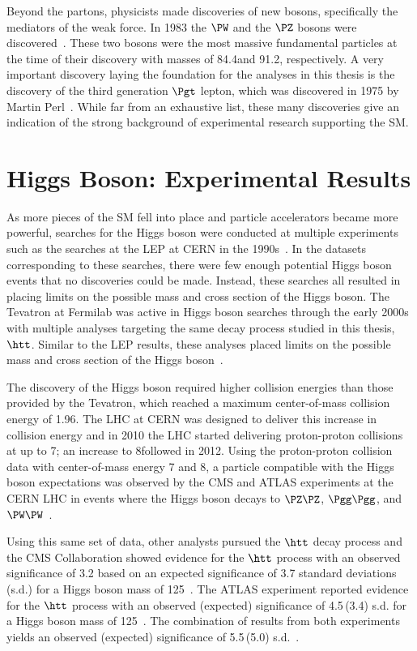 Beyond the partons, physicists made discoveries of new bosons, specifically the mediators
of the weak force.
In 1983 the $\PW$ and the $\PZ$ bosons were discovered~\cite{AUBERT1983275,1983398}. 
These two bosons were the
most massive fundamental particles at the time of their discovery with masses of
84.4\GeV and 91.2\GeV, respectively.
A very important discovery laying the foundation for the analyses in this thesis is
the discovery of the third generation $\Pgt$ lepton, which was discovered
in 1975 by Martin Perl~\cite{PhysRevLett.35.1489}. While far from an exhaustive list,
these many discoveries give an indication of the strong background of experimental
research supporting the SM.

\section{Higgs Boson: Experimental Results}
As more pieces of the SM fell into place and particle accelerators became more powerful,
searches for the Higgs boson were conducted at multiple experiments such as the searches
at the LEP at CERN in the 1990s~\cite{Barate:2000ts,Abdallah:2003ip,Achard:2001pj,Abbiendi:2000ac}.
In the datasets corresponding to these searches, there were few enough potential Higgs
boson events that no discoveries could be made.
Instead, these searches all resulted in placing limits on the possible mass and cross section
of the Higgs boson. The Tevatron at Fermilab was active in Higgs boson searches through the early 2000s
with multiple analyses targeting the same decay process studied in this thesis, $\htt$. 
Similar to the LEP results, these analyses
placed limits on the possible mass and cross section of the Higgs boson~\cite{Aaltonen:2012jh, Abazov:2012zj}.

The discovery of the Higgs boson required higher collision energies than those provided
by the Tevatron, which reached a maximum center-of-mass collision energy of 1.96\TeV. The
LHC at CERN was designed to deliver this increase in collision energy and in 2010 the LHC started
delivering proton-proton collisions at up to 7\TeV; an increase to 8\TeV followed in 2012.
Using the proton-proton collision data with center-of-mass energy 7 and 8\TeV,
a particle compatible with the Higgs boson expectations was observed by the CMS and ATLAS experiments at the CERN LHC
in events where the Higgs boson decays to $\PZ\PZ$, $\Pgg\Pgg$, and 
$\PW\PW$~\cite{Aad:2012tfa, Chatrchyan:2012xdj, Chatrchyan:2013lba}.

Using this same set of data, other analysts pursued the $\htt$ decay process and
the CMS Collaboration showed evidence for the $\htt$ process with an observed
significance of 3.2 based on an expected significance of 3.7 standard deviations (s.d.)
for a Higgs boson mass of 125\GeV~\cite{Chatrchyan:2014nva}.
The ATLAS experiment reported evidence for the $\htt$ process 
with an observed (expected) significance of 4.5\,(3.4)
s.d. for a Higgs boson mass of 125\GeV~\cite{Aad:2015vsa}.
The combination of results from both experiments yields an observed (expected)
significance of 5.5\,(5.0) s.d.~\cite{Khachatryan:2016vau}.

